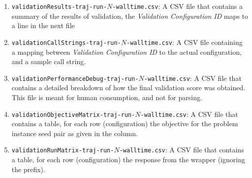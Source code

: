 \documentclass[manual.tex]{subfiles}
\begin{document}
\begin{enumerate}
\item \texttt{validationResults-traj-run-$N$-walltime.csv}:
A CSV file that contains a summary of the results of validation, the \textit{Validation Configuration ID} maps to a line in the next file

\item \texttt{validationCallStrings-traj-run-$N$-walltime.csv}:
A CSV file containing a mapping between \textit{Validation Configuration ID} to
the actual configuration, and a sample call string.

\item \texttt{validationPerformanceDebug-traj-run-$N$-walltime.csv}:
A CSV file that contains a detailed breakdown of how the final validation score
was obtained. This file is meant for human consumption, and not for parsing.

\item \texttt{validationObjectiveMatrix-traj-run-$N$-walltime.csv}:
A CSV file that contains a table, for each row (configuration) the objective for the problem instance seed pair as given in the column.

\item \texttt{validationRunMatrix-traj-run-$N$-walltime.csv}:
A CSV file that contains a table, for each row (configuration) the response from the wrapper (ignoring the prefix).

\end{enumerate}




%
%
%
%
%
%
%
%





\end{document}
